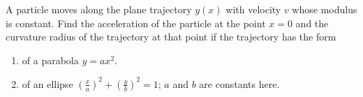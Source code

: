 
\item A particle moves along the plane trajectory \(y(x)\) with velocity \(v\) whose modulus is constant. Find the acceleration of the particle at the point \(x = 0\) and the curvature radius of the trajectory at that point if the trajectory has the form
    \begin{enumerate}
        \item of a parabola \(y = ax^2\).
        \item of an ellipse \(\left(\frac{x}{a}\right)^2 + \left(\frac{y}{b}\right)^2 = 1\); \(a\) and \(b\) are constants here.
    \end{enumerate}


\begin{solution}
    \begin{center}
    \end{center}
    

\end{solution}
